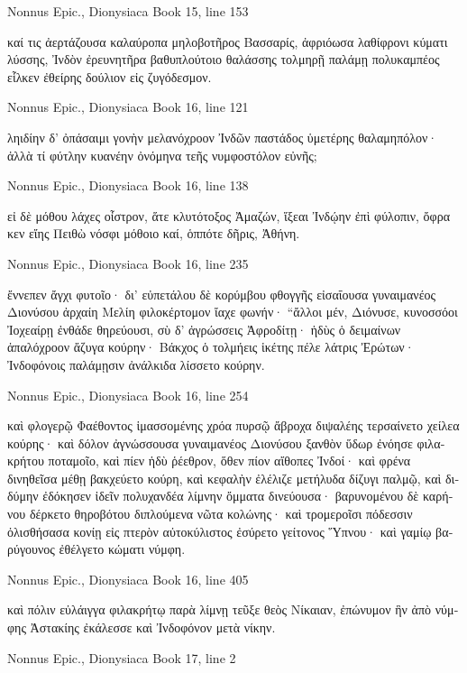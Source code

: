 \documentclass[12pt,letterpaper,twoside,final]{memoir}
\begin{document}
\begin{greek}
Nonnus Epic., Dionysiaca 
Book 15, line 153

καί τις ἀερτάζουσα καλαύροπα μηλοβοτῆρος 
Βασσαρίς, ἀφριόωσα λαθίφρονι κύματι λύσσης, 
Ἰνδὸν ἐρευνητῆρα βαθυπλούτοιο θαλάσσης 
τολμηρῇ παλάμῃ πολυκαμπέος εἷλκεν ἐθείρης 
δούλιον εἰς ζυγόδεσμον. 



Nonnus Epic., Dionysiaca 
Book 16, line 121

ληιδίην δ' ὀπάσαιμι γονὴν μελανόχροον Ἰνδῶν 
παστάδος ὑμετέρης θαλαμηπόλον· ἀλλὰ τί φύτλην 
κυανέην ὀνόμηνα τεῆς νυμφοστόλον εὐνῆς; 



Nonnus Epic., Dionysiaca 
Book 16, line 138

εἰ δὲ μόθου λάχες οἶστρον, ἅτε κλυτότοξος Ἀμαζών, 
ἵξεαι Ἰνδῴην ἐπὶ φύλοπιν, ὄφρα κεν εἴης 
Πειθὼ νόσφι μόθοιο καί, ὁππότε δῆρις, Ἀθήνη. 



Nonnus Epic., Dionysiaca 
Book 16, line 235

ἔννεπεν ἄγχι φυτοῖο· δι' εὐπετάλου δὲ κορύμβου   
φθογγῆς εἰσαΐουσα γυναιμανέος Διονύσου 
ἀρχαίη Μελίη φιλοκέρτομον ἴαχε φωνήν· 
 “ἄλλοι μέν, Διόνυσε, κυνοσσόοι Ἰοχεαίρῃ 
ἐνθάδε θηρεύουσι, σὺ δ' ἀγρώσσεις Ἀφροδίτῃ· 
ἡδὺς ὁ δειμαίνων ἁπαλόχροον ἄζυγα κούρην· 
Βάκχος ὁ τολμήεις ἱκέτης πέλε λάτρις Ἐρώτων· 
Ἰνδοφόνοις παλάμῃσιν ἀνάλκιδα λίσσετο κούρην. 



Nonnus Epic., Dionysiaca 
Book 16, line 254

καὶ φλογερῷ Φαέθοντος ἱμασσομένης χρόα πυρσῷ 
ἄβροχα διψαλέης τερσαίνετο χείλεα κούρης·   
καὶ δόλον ἀγνώσσουσα γυναιμανέος Διονύσου 
ξανθὸν ὕδωρ ἐνόησε φιλακρήτου ποταμοῖο, 
καὶ πίεν ἡδὺ ῥέεθρον, ὅθεν πίον αἴθοπες Ἰνδοί· 
καὶ φρένα δινηθεῖσα μέθῃ βακχεύετο κούρη, 
καὶ κεφαλὴν ἐλέλιζε μετήλυδα δίζυγι παλμῷ, 
καὶ διδύμην ἐδόκησεν ἰδεῖν πολυχανδέα λίμνην 
ὄμματα δινεύουσα· βαρυνομένου δὲ καρήνου 
δέρκετο θηροβότου διπλούμενα νῶτα κολώνης· 
καὶ τρομεροῖσι πόδεσσιν ὀλισθήσασα κονίῃ 
εἰς πτερὸν αὐτοκύλιστος ἐσύρετο γείτονος Ὕπνου· 
καὶ γαμίῳ βαρύγουνος ἐθέλγετο κώματι νύμφη. 



Nonnus Epic., Dionysiaca 
Book 16, line 405

καὶ πόλιν εὐλάιγγα φιλακρήτῳ παρὰ λίμνῃ 
τεῦξε θεὸς Νίκαιαν, ἐπώνυμον ἣν ἀπὸ νύμφης 
Ἀστακίης ἐκάλεσσε καὶ Ἰνδοφόνον μετὰ νίκην. 



Nonnus Epic., Dionysiaca 
Book 17, line 2


\end{greek}
\end{document}
